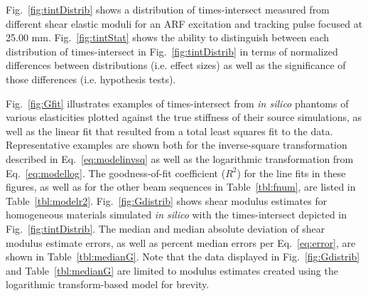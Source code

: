 
Fig.~\ref{fig:tintDistrib} shows a distribution of times-intersect measured from different shear elastic moduli for an ARF excitation and tracking pulse focused at 25.00 mm. Fig.~\ref{fig:tintStat} shows the ability to distinguish between each distribution of times-intersect in Fig.~\ref{fig:tintDistrib} in terms of normalized differences between distributions (i.e. effect sizes) as well as the significance of those differences (i.e. hypothesis tests).

Fig.~\ref{fig:Gfit} illustrates examples of times-intersect from \emph{in silico} phantoms of various elasticities plotted against the true stiffness of their source simulations, as well as the linear fit that resulted from a total least squares fit to the data. Representative examples are shown both for the inverse-square transformation described in Eq.~\ref{eq:modelinvsq} as well as the logarithmic transformation from Eq.~\ref{eq:modellog}. The goodness-of-fit coefficient ($R^2$) for the line fits in these figures, as well as for the other beam sequences in Table~\ref{tbl:fnum}, are listed in Table~\ref{tbl:modelr2}. Fig.~\ref{fig:Gdistrib} shows shear modulus estimates for homogeneous materials simulated \emph{in silico} with the times-intersect depicted in Fig.~\ref{fig:tintDistrib}. The median and median absolute deviation of shear modulus estimate errors, as well as percent median errors per Eq.~\ref{eq:error}, are shown in Table~\ref{tbl:medianG}. Note that the data displayed in Fig.~\ref{fig:Gdistrib} and Table~\ref{tbl:medianG} are limited to modulus estimates created using the logarithmic transform-based model for brevity. 

